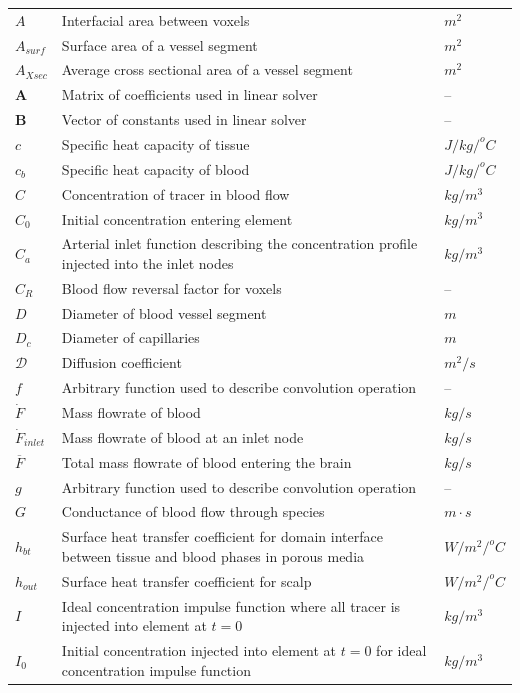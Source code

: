 \documentclass[11pt,english,a4paper,twoside,openright]{report}
\begin{document}
{{{\begin{center}
\begin{longtable}[H]{L{0.1\textwidth} L{0.50\textwidth} R{0.15\textwidth}}
		$A$ & Interfacial area between voxels & $m^2$ \\
		$A_{surf}$ & Surface area of a vessel segment & $m^2$ \\
		$A_{Xsec}$ & Average cross sectional area of a vessel segment & $m^2$ \\
		$\mathbf{A}$ & Matrix of coefficients used in linear solver & -- \\
		$\mathbf{B}$ & Vector of constants used in linear solver & -- \\
		$c$ & Specific heat capacity of tissue & $J/kg/^{o}C$ \\
		$c_{b}$ & Specific heat capacity of blood & $J/kg/^{o}C$ \\
		$C$ & Concentration of tracer in blood flow & $kg/m^3$ \\
		$C_{0}$ & Initial concentration entering element & $kg/m^3$ \\
		$C_{a}$ & Arterial inlet function describing the concentration profile injected into the inlet nodes & $kg/m^3$ \\
		$C_{R}$ & Blood flow reversal factor for voxels  & --\\
		$D$ & Diameter of blood vessel segment & $m$ \\
		$D_{c}$ & Diameter of capillaries & $m$ \\
		$\mathcal{D}$ & Diffusion coefficient & $m^2/s$ \\
		$f$ & Arbitrary function used to describe convolution operation & -- \\
		$\dot{F}$ & Mass flowrate of blood & $kg/s$ \\
		$\dot{F}_{inlet}$ & Mass flowrate of blood at an inlet node & $kg/s$ \\
		$\overline{F}$ & Total mass flowrate of blood entering the brain & $kg/s$ \\
		$g$ & Arbitrary function used to describe convolution operation & -- \\
		$G$ & Conductance of blood flow through species &  $m{\cdot}s$\\
		$h_{bt}$ & Surface heat transfer coefficient for domain interface between tissue and blood phases in porous media & $W/m^2/^{o}C$ \\
		$h_{out}$ & Surface heat transfer coefficient for scalp & $W/m^2/^{o}C$ \\
		$I$ & Ideal concentration impulse function where all tracer is injected into element at $t=0$ & $kg/m^3$\\
		$I_{0}$ & Initial concentration injected into element at $t=0$ for ideal concentration impulse function & $kg/m^3$\\

\end{longtable}
\end{center}}}}
\end{document}
